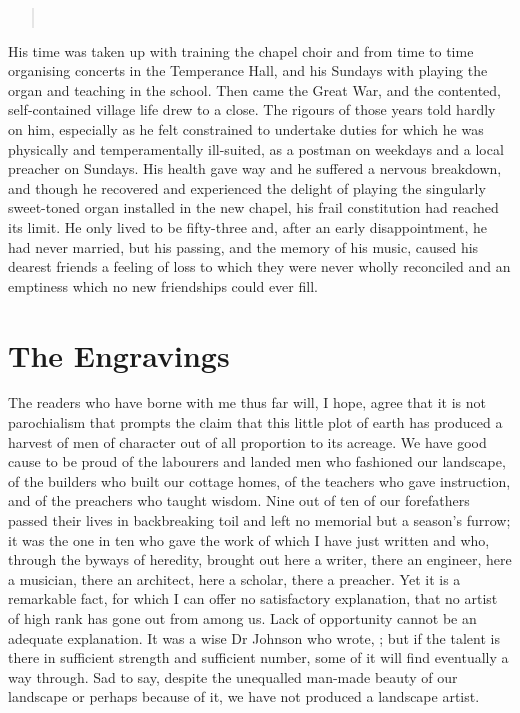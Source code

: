 \begin{quote}
 \\
\end{quote}

His  time	was taken up with training the chapel choir and from time to time organising concerts in the Temperance Hall, and his Sundays with playing	the organ and teaching in the school. Then came the Great War, and the contented, self-contained village life drew to a close. The rigours of those years told hardly on him, especially as he felt constrained to undertake duties for which he was physically and temperamentally ill-suited, as a postman on weekdays and a local preacher on Sundays. His health gave way and he suffered a nervous breakdown, and though he recovered and experienced the delight of playing the singularly sweet-toned organ installed in the new chapel, his frail constitution had reached its limit. He only lived to be fifty-three and, after an early disappointment, he had never married, but his passing, and the memory of his music, caused his dearest friends a feeling of loss to which they were never wholly reconciled and an emptiness which no new friendships could ever fill.
 
\section{The Engravings}

The readers who have borne with me thus far will, I hope, agree that it is not parochialism that prompts the claim that this little plot of earth has produced a harvest of men of character out of all proportion to its acreage. We have good cause to be proud of the labourers and landed men who fashioned our landscape, of the builders who built our cottage homes, of the teachers who gave instruction, and of the preachers who taught wisdom. Nine out of ten of our forefathers passed their lives in backbreaking toil and left no memorial but a season's furrow; it was the one in ten who gave the work of which I have just written and who, through the byways of heredity, brought out here a writer, there an engineer, here a musician, there an architect, here a scholar, there a preacher. Yet it is a remarkable fact, for which I can offer no satisfactory explanation, that no artist of high rank has gone out from among us. Lack of opportunity cannot be an adequate explanation. It was a wise Dr Johnson who wrote, ; but if the talent is there in sufficient strength and sufficient number, some of it will find eventually a way through. Sad to say, despite the unequalled man-made beauty of our landscape or perhaps because of it, we have not produced a landscape artist.

